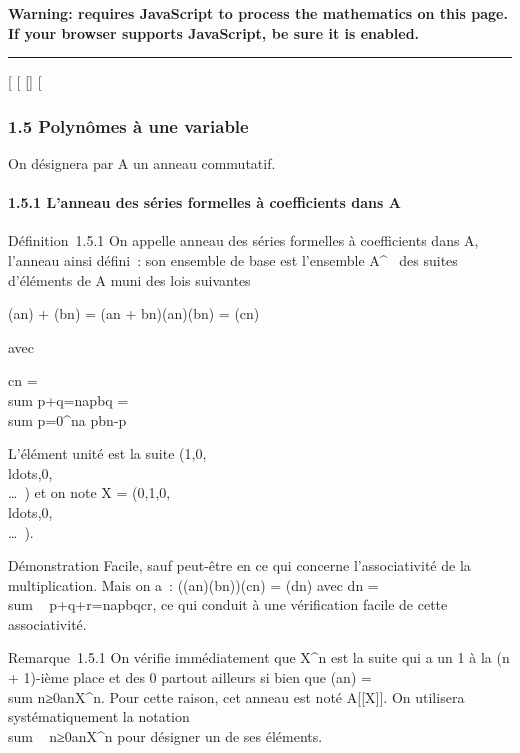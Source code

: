 \textbf{Warning: 
requires JavaScript to process the mathematics on this page.\\ If your
browser supports JavaScript, be sure it is enabled.}

\begin{center}\rule{3in}{0.4pt}\end{center}

{[}
{[}
{[}{]}
{[}

\subsubsection{1.5 Polynômes à une variable}

On désignera par A un anneau commutatif.

\paragraph{1.5.1 L'anneau des séries formelles à coefficients dans A}

Définition~1.5.1 On appelle anneau des séries formelles à coefficients
dans A, l'anneau ainsi défini~: son ensemble de base est l'ensemble
A^~ des suites d'éléments de A muni des lois suivantes

(an) + (bn) = (an +
bn)\quad (an)(bn) =
(cn)

avec

cn = \\sum
p+q=napbq = \\sum
p=0^na pbn-p

L'élément unité est la suite
(1,0,\\ldots,0,\\\ldots~)
et on note X =
(0,1,0,\\ldots,0,\\\ldots~).

Démonstration Facile, sauf peut-être en ce qui concerne l'associativité
de la multiplication. Mais on a~:
((an)(bn))(cn) = (dn) avec
dn = \\sum ~
p+q+r=napbqcr, ce qui conduit à
une vérification facile de cette associativité.

Remarque~1.5.1 On vérifie immédiatement que X^n est la suite
qui a un 1 à la (n + 1)-ième place et des 0 partout ailleurs si bien que
(an) =\ \\sum
 n≥0anX^n. Pour cette raison, cet
anneau est noté A{[}{[}X{]}{]}. On utilisera systématiquement la
notation \\sum ~
n≥0anX^n pour désigner un de ses éléments.

